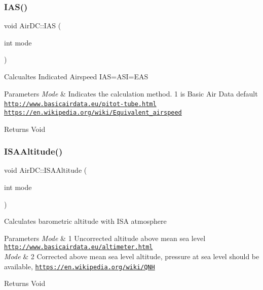 \subsubsection{\texorpdfstring{I\+A\+S()}{IAS()}}
{\footnotesize\ttfamily void Air\+D\+C\+::\+I\+AS (\begin{DoxyParamCaption}\item[{int}]{mode }\end{DoxyParamCaption})}

Calcualtes Indicated Airspeed I\+AS=A\+SI=E\+AS 
\begin{DoxyParams}{Parameters}
{\em Mode} & Indicates the calculation method. 1 is Basic Air Data default \href{http://www.basicairdata.eu/pitot-tube.html}{\tt http\+://www.\+basicairdata.\+eu/pitot-\/tube.\+html}~\newline
 \href{https://en.wikipedia.org/wiki/Equivalent_airspeed}{\tt https\+://en.\+wikipedia.\+org/wiki/\+Equivalent\+\_\+airspeed} \\
\hline
\end{DoxyParams}
\begin{DoxyReturn}{Returns}
Void 
\end{DoxyReturn}
\mbox{\label{class_air_d_c_a1032c849abc753d30bb02b08d2809258}} 
\subsubsection{\texorpdfstring{I\+S\+A\+Altitude()}{ISAAltitude()}}
{\footnotesize\ttfamily void Air\+D\+C\+::\+I\+S\+A\+Altitude (\begin{DoxyParamCaption}\item[{int}]{mode }\end{DoxyParamCaption})}

Calculates barometric altitude with I\+SA atmosphere 
\begin{DoxyParams}{Parameters}
{\em Mode} & 1 Uncorrected altitude above mean sea level \href{http://www.basicairdata.eu/altimeter.html}{\tt http\+://www.\+basicairdata.\+eu/altimeter.\+html} \\
\hline
{\em Mode} & 2 Corrected above mean sea level altitude, pressure at sea level should be available, \href{https://en.wikipedia.org/wiki/QNH}{\tt https\+://en.\+wikipedia.\+org/wiki/\+Q\+NH} \\
\hline
\end{DoxyParams}
\begin{DoxyReturn}{Returns}
Void 
\end{DoxyReturn}
\mbox{\label{class_air_d_c_a6e8f15eedeebbd094259bb38b9e0307a}} 
